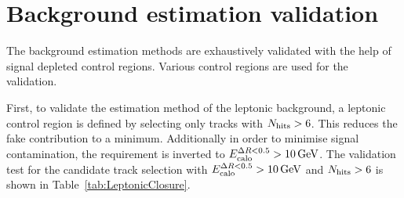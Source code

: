 \section{Background estimation validation}
\label{sec:BkgValidation}

The background estimation methods are exhaustively validated with the help of signal depleted control regions.
Various control regions are used for the validation.

First, to validate the estimation method of the leptonic background, a leptonic control region is defined by selecting only tracks with $N_{\text{hits}}>6$.
This reduces the fake contribution to a minimum.
Additionally in order to minimise signal contamination, the \ecalo requirement is inverted to $E^{\Delta R<0.5}_{\text{calo}}>10\,\text{Ge}\kern-0.06667em\text{V}$.
The validation test for the candidate track selection with $E^{\Delta R<0.5}_{\text{calo}}>10\,\text{Ge}\kern-0.06667em\text{V}$ and $N_{\text{hits}}>6$ is shown in Table~\ref{tab:LeptonicClosure}.
\renewcommand{\arraystretch}{1.5}
